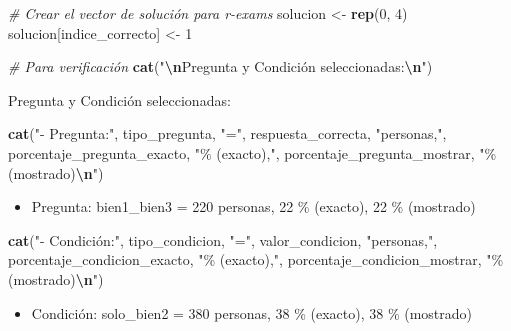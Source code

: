 \documentclass[
]{article}
\newenvironment{Shaded}{\begin{snugshade}}{\end{snugshade}}
\newcommand{\CommentTok}[1]{\textcolor[rgb]{0.56,0.35,0.01}{\textit{#1}}}
\newcommand{\DecValTok}[1]{\textcolor[rgb]{0.00,0.00,0.81}{#1}}
\newcommand{\FunctionTok}[1]{\textcolor[rgb]{0.13,0.29,0.53}{\textbf{#1}}}
\newcommand{\NormalTok}[1]{#1}
\newcommand{\OtherTok}[1]{\textcolor[rgb]{0.56,0.35,0.01}{#1}}
\newcommand{\SpecialCharTok}[1]{\textcolor[rgb]{0.81,0.36,0.00}{\textbf{#1}}}
\newcommand{\StringTok}[1]{\textcolor[rgb]{0.31,0.60,0.02}{#1}}
\providecommand{\tightlist}{%
  \setlength{\itemsep}{0pt}\setlength{\parskip}{0pt}}
\begin{document}
\begin{Shaded}
\begin{Highlighting}[]
\CommentTok{\# Crear el vector de solución para r{-}exams}
\NormalTok{solucion }\OtherTok{\textless{}{-}} \FunctionTok{rep}\NormalTok{(}\DecValTok{0}\NormalTok{, }\DecValTok{4}\NormalTok{)}
\NormalTok{solucion[indice\_correcto] }\OtherTok{\textless{}{-}} \DecValTok{1}

\CommentTok{\# Para verificación}
\FunctionTok{cat}\NormalTok{(}\StringTok{"}\SpecialCharTok{\textbackslash{}n}\StringTok{Pregunta y Condición seleccionadas:}\SpecialCharTok{\textbackslash{}n}\StringTok{"}\NormalTok{)}
\end{Highlighting}
\end{Shaded}

Pregunta y Condición seleccionadas:

\begin{Shaded}
\begin{Highlighting}[]
\FunctionTok{cat}\NormalTok{(}\StringTok{"{-} Pregunta:"}\NormalTok{, tipo\_pregunta, }\StringTok{"="}\NormalTok{, respuesta\_correcta, }\StringTok{"personas,"}\NormalTok{,}
\NormalTok{    porcentaje\_pregunta\_exacto, }\StringTok{"\% (exacto),"}\NormalTok{, porcentaje\_pregunta\_mostrar, }\StringTok{"\% (mostrado)}\SpecialCharTok{\textbackslash{}n}\StringTok{"}\NormalTok{)}
\end{Highlighting}
\end{Shaded}

\begin{itemize}
\tightlist
\item
  Pregunta: bien1\_bien3 = 220 personas, 22 \% (exacto), 22 \%
  (mostrado)
\end{itemize}

\begin{Shaded}
\begin{Highlighting}[]
\FunctionTok{cat}\NormalTok{(}\StringTok{"{-} Condición:"}\NormalTok{, tipo\_condicion, }\StringTok{"="}\NormalTok{, valor\_condicion, }\StringTok{"personas,"}\NormalTok{,}
\NormalTok{    porcentaje\_condicion\_exacto, }\StringTok{"\% (exacto),"}\NormalTok{, porcentaje\_condicion\_mostrar, }\StringTok{"\% (mostrado)}\SpecialCharTok{\textbackslash{}n}\StringTok{"}\NormalTok{)}
\end{Highlighting}
\end{Shaded}

\begin{itemize}
\tightlist
\item
  Condición: solo\_bien2 = 380 personas, 38 \% (exacto), 38 \%
  (mostrado)
\end{itemize}
\end{document}
